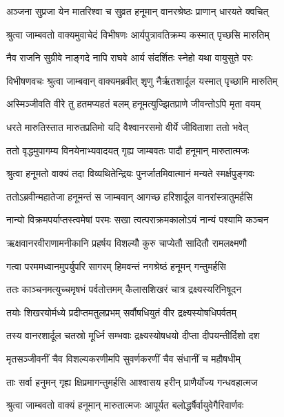 \twolineshloka
{अञ्जना सुप्रजा येन मातरिश्वा च सुव्रत}
{हनूमान् वानरश्रेष्ठः प्राणान् धारयते क्वचित्} %

\twolineshloka
{श्रुत्वा जाम्बवतो वाक्यमुवाचेदं विभीषणः}
{आर्यपुत्रावतिक्रम्य कस्मात् पृच्छसि मारुतिम्} %

\twolineshloka
{नैव राजनि सुग्रीवे नाङ्गदे नापि राघवे}
{आर्य संदर्शितः स्नेहो यथा वायुसुते परः} %

\twolineshloka
{विभीषणवचः श्रुत्वा जाम्बवान् वाक्यमब्रवीत्}
{शृणु नैर्ऋतशार्दूल यस्मात् पृच्छामि मारुतिम्} %

\twolineshloka
{अस्मिञ्जीवति वीरे तु हतमप्यहतं बलम्}
{हनूमत्युज्झितप्राणे जीवन्तोऽपि मृता वयम्} %

\twolineshloka
{धरते मारुतिस्तात मारुतप्रतिमो यदि}
{वैश्वानरसमो वीर्ये जीविताशा ततो भवेत्} %

\twolineshloka
{ततो वृद्धमुपागम्य विनयेनाभ्यवादयत्}
{गृह्य जाम्बवतः पादौ हनूमान् मारुतात्मजः} %

\twolineshloka
{श्रुत्वा हनूमतो वाक्यं तदा विव्यथितेन्द्रियः}
{पुनर्जातमिवात्मानं मन्यते स्मर्क्षपुङ्गवः} %

\twolineshloka
{ततोऽब्रवीन्महातेजा हनूमन्तं स जाम्बवान्}
{आगच्छ हरिशार्दूल वानरांस्त्रातुमर्हसि} %

\twolineshloka
{नान्यो विक्रमपर्याप्तस्त्वमेषां परमः सखा}
{त्वत्पराक्रमकालोऽयं नान्यं पश्यामि कञ्चन} %

\twolineshloka
{ऋक्षवानरवीराणामनीकानि प्रहर्षय}
{विशल्यौ कुरु चाप्येतौ सादितौ रामलक्ष्मणौ} %

\twolineshloka
{गत्वा परममध्वानमुपर्युपरि सागरम्}
{हिमवन्तं नगश्रेष्ठं हनूमन् गन्तुमर्हसि} %

\twolineshloka
{ततः काञ्चनमत्युच्चमृषभं पर्वतोत्तमम्}
{कैलासशिखरं चात्र द्रक्ष्यस्यरिनिषूदन} %

\twolineshloka
{तयोः शिखरयोर्मध्ये प्रदीप्तमतुलप्रभम्}
{सर्वौषधियुतं वीर द्रक्ष्यस्योषधिपर्वतम्} %

\twolineshloka
{तस्य वानरशार्दूल चतस्रो मूर्ध्नि सम्भवाः}
{द्रक्ष्यस्योषधयो दीप्ता दीपयन्तीर्दिशो दश} %

\twolineshloka
{मृतसञ्जीवनीं चैव विशल्यकरणीमपि}
{सुवर्णकरणीं चैव संधानीं च महौषधीम्} %

\twolineshloka
{ताः सर्वा हनुमन् गृह्य क्षिप्रमागन्तुमर्हसि}
{आश्वासय हरीन् प्राणैर्योज्य गन्धवहात्मज} %

\twolineshloka
{श्रुत्वा जाम्बवतो वाक्यं हनूमान् मारुतात्मजः}
{आपूर्यत बलोद्धर्षैर्वायुवेगैरिवार्णवः} %

